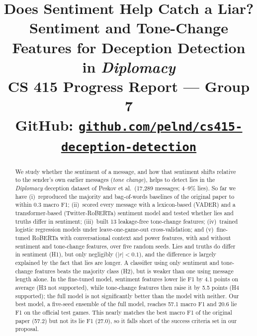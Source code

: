 \documentclass[conference]{IEEEtran}
\newcommand{\repourl}{https://github.com/pelnd/cs415-deception-detection}
\begin{document}
\title{Does Sentiment Help Catch a Liar?\\
Sentiment and Tone-Change Features for Deception Detection in \textit{Diplomacy}\\
{\large CS 415 Progress Report --- Group 7}\\[2pt]
{\normalsize GitHub: \href{\repourl}{\texttt{github.com/pelnd/cs415-deception-detection}}}}

\author{
\and
{}
\and
{}
}

\maketitle

\begin{abstract}
We study whether the sentiment of a message, and how that sentiment shifts relative to the sender's own earlier messages (\emph{tone change}), helps to detect lies in the \textit{Diplomacy} deception dataset of Peskov et al.\ (17{,}289 messages; 4--9\% lies). So far we have (i)~reproduced the majority and bag-of-words baselines of the original paper to within 0.3 macro F1; (ii)~scored every message with a lexicon-based (VADER) and a transformer-based (Twitter-RoBERTa) sentiment model and tested whether lies and truths differ in sentiment; (iii)~built 13 leakage-free tone-change features; (iv)~trained logistic regression models under leave-one-game-out cross-validation; and (v)~fine-tuned RoBERTa with conversational context and power features, with and without sentiment and tone-change features, over five random seeds. Lies and truths do differ in sentiment (H1), but only negligibly ($|r|<0.1$), and the difference is largely explained by the fact that lies are longer. A classifier using only sentiment and tone-change features beats the majority class (H2), but is weaker than one using message length alone. In the fine-tuned model, sentiment features lower lie F1 by 4.1 points on average (H3 not supported), while tone-change features then raise it by 5.5 points (H4 supported); the full model is not significantly better than the model with neither. Our best model, a five-seed ensemble of the full model, reaches 57.1 macro F1 and 20.6 lie F1 on the official test games. This nearly matches the best macro F1 of the original paper (57.2) but not its lie F1 (27.0), so it falls short of the success criteria set in our proposal.
\end{abstract}
\end{document}
